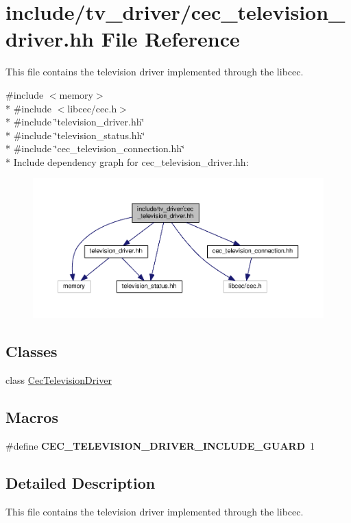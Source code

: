 \hypertarget{cec__television__driver_8hh}{\section{include/tv\+\_\+driver/cec\+\_\+television\+\_\+driver.hh File Reference}
\label{cec__television__driver_8hh}
}


This file contains the television driver implemented through the libcec.  


{\ttfamily \#include $<$memory$>$}\\*
{\ttfamily \#include $<$libcec/cec.\+h$>$}\\*
{\ttfamily \#include \char`\"{}television\+\_\+driver.\+hh\char`\"{}}\\*
{\ttfamily \#include \char`\"{}television\+\_\+status.\+hh\char`\"{}}\\*
{\ttfamily \#include \char`\"{}cec\+\_\+television\+\_\+connection.\+hh\char`\"{}}\\*
Include dependency graph for cec\+\_\+television\+\_\+driver.\+hh\+:
\nopagebreak
\begin{figure}[H]
\begin{center}
\leavevmode
\includegraphics[width=350pt]{cec__television__driver_8hh__incl}
\end{center}
\end{figure}
\subsection*{Classes}
\begin{DoxyCompactItemize}
\item 
class \hyperlink{classCecTelevisionDriver}{Cec\+Television\+Driver}
\end{DoxyCompactItemize}
\subsection*{Macros}
\begin{DoxyCompactItemize}
\item 
\hypertarget{cec__television__driver_8hh_aafe39fbbaeed9bc4cd833e5bfe530309}{\#define {\bfseries C\+E\+C\+\_\+\+T\+E\+L\+E\+V\+I\+S\+I\+O\+N\+\_\+\+D\+R\+I\+V\+E\+R\+\_\+\+I\+N\+C\+L\+U\+D\+E\+\_\+\+G\+U\+A\+R\+D}~1}\label{cec__television__driver_8hh_aafe39fbbaeed9bc4cd833e5bfe530309}

\end{DoxyCompactItemize}


\subsection{Detailed Description}
This file contains the television driver implemented through the libcec. 

